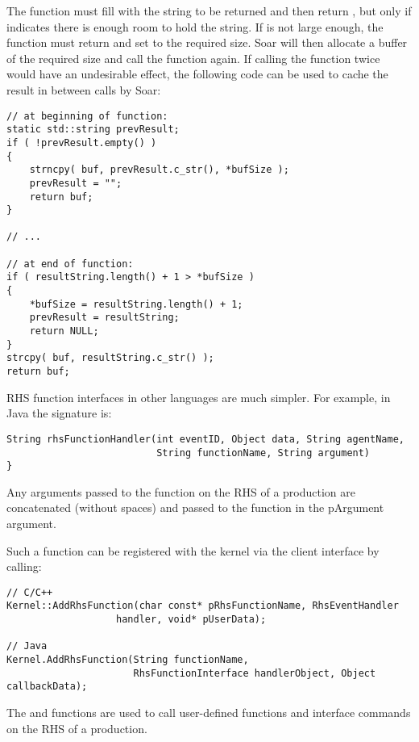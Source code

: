 The function must fill  with the string to be returned and then return , but only
if  indicates there is enough room to hold the string. If  is not large enough,
the function must return  and set  to the required size. Soar will then allocate a
buffer of the required size and call the function again. If calling the function twice would have an undesirable
effect, the following code can be used to cache the result in between calls by Soar:

\begin{verbatim}
// at beginning of function:
static std::string prevResult;
if ( !prevResult.empty() )
{
    strncpy( buf, prevResult.c_str(), *bufSize );
    prevResult = "";
    return buf;
}

// ...

// at end of function:
if ( resultString.length() + 1 > *bufSize )
{
    *bufSize = resultString.length() + 1;
    prevResult = resultString;
    return NULL;
}
strcpy( buf, resultString.c_str() );
return buf;
\end{verbatim}

RHS function interfaces in other languages are much simpler. For example, in Java the signature is:

\begin{verbatim}
String rhsFunctionHandler(int eventID, Object data, String agentName,
						  String functionName, String argument)
}
\end{verbatim}

Any arguments passed to the function on the RHS of a production are concatenated (without spaces) and passed to the function in the pArgument argument.

Such a function can be registered with the kernel via the client interface by calling:

\begin{verbatim}
// C/C++
Kernel::AddRhsFunction(char const* pRhsFunctionName, RhsEventHandler
                   handler, void* pUserData);

// Java
Kernel.AddRhsFunction(String functionName,
					  RhsFunctionInterface handlerObject, Object callbackData);
\end{verbatim}

The  and  functions are used to call user-defined functions and interface commands on the RHS of a production.

